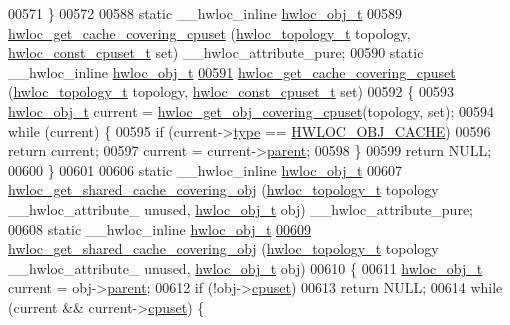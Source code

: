\begin{DoxyCode}
00571 \}
00572 
00588 \textcolor{keyword}{static} \_\_hwloc\_inline \hyperlink{a00016}{hwloc_obj_t}
00589 \hyperlink{a00057_ga2f936fd9a9c62f6d9b9951de3062e889}{hwloc_get_cache_covering_cpuset} (\hyperlink{a00039_ga9d1e76ee15a7dee158b786c30b6a6e38}{hwloc_topology_t} topology, \hyperlink{a00040_ga1f784433e9b606261f62d1134f6a3b25}{hwloc_const_cpuset_t} 
      \textcolor{keyword}{set}) \_\_hwloc\_attribute\_pure;
00590 static \_\_hwloc\_inline \hyperlink{a00016}{hwloc_obj_t}
\hypertarget{a00031_source_l00591}{}\hyperlink{a00057_ga2f936fd9a9c62f6d9b9951de3062e889}{00591} \hyperlink{a00057_ga2f936fd9a9c62f6d9b9951de3062e889}{hwloc_get_cache_covering_cpuset} (\hyperlink{a00039_ga9d1e76ee15a7dee158b786c30b6a6e38}{hwloc_topology_t} topology, \hyperlink{a00040_ga1f784433e9b606261f62d1134f6a3b25}{hwloc_const_cpuset_t} 
      set)
00592 \{
00593   \hyperlink{a00016}{hwloc_obj_t} current = \hyperlink{a00055_ga68300dd0ee9c36a7a90f275a59e9af28}{hwloc_get_obj_covering_cpuset}(topology, \textcolor{keyword}{set});
00594   \textcolor{keywordflow}{while} (current) \{
00595     \textcolor{keywordflow}{if} (current->\hyperlink{a00016_acc4f0803f244867e68fe0036800be5de}{type} == \hyperlink{a00041_ggacd37bb612667dc437d66bfb175a8dc55a56ee0b7eca88f363b75b34fdde8c9ddc}{HWLOC_OBJ_CACHE})
00596       \textcolor{keywordflow}{return} current;
00597     current = current->\hyperlink{a00016_adc494f6aed939992be1c55cca5822900}{parent};
00598   \}
00599   \textcolor{keywordflow}{return} NULL;
00600 \}
00601 
00606 \textcolor{keyword}{static} \_\_hwloc\_inline \hyperlink{a00016}{hwloc_obj_t}
00607 \hyperlink{a00057_ga000e08a1da039130daa072e77713bb43}{hwloc_get_shared_cache_covering_obj} (\hyperlink{a00039_ga9d1e76ee15a7dee158b786c30b6a6e38}{hwloc_topology_t} topology \_\_hwloc\_attribute\_
      unused, \hyperlink{a00016}{hwloc_obj_t} obj) \_\_hwloc\_attribute\_pure;
00608 \textcolor{keyword}{static} \_\_hwloc\_inline \hyperlink{a00016}{hwloc_obj_t}
\hypertarget{a00031_source_l00609}{}\hyperlink{a00057_ga000e08a1da039130daa072e77713bb43}{00609} \hyperlink{a00057_ga000e08a1da039130daa072e77713bb43}{hwloc_get_shared_cache_covering_obj} (\hyperlink{a00039_ga9d1e76ee15a7dee158b786c30b6a6e38}{hwloc_topology_t} topology \_\_hwloc\_attribute\_
      unused, \hyperlink{a00016}{hwloc_obj_t} obj)
00610 \{
00611   \hyperlink{a00016}{hwloc_obj_t} current = obj->\hyperlink{a00016_adc494f6aed939992be1c55cca5822900}{parent};
00612   \textcolor{keywordflow}{if} (!obj->\hyperlink{a00016_a67925e0f2c47f50408fbdb9bddd0790f}{cpuset})
00613     \textcolor{keywordflow}{return} NULL;
00614   \textcolor{keywordflow}{while} (current && current->\hyperlink{a00016_a67925e0f2c47f50408fbdb9bddd0790f}{cpuset}) \{

\end{DoxyCode}
